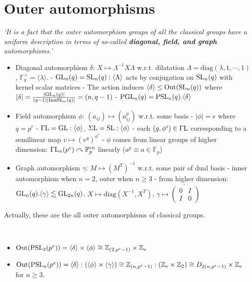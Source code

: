 \documentclass[a4paper,11pt]{article}
\def\subtitle#1{\section{#1}}
\begin{document}
\subtitle{Outer automorphisms}

\textit{`It is a fact that the outer automorphism groups of all the classical groups have a uniform description in terms of so-called \textbf{diagonal, field, and graph} automorphisms.’}

\begin{itemize}
    \item Diagonal automorphism $\delta$: $X\mapsto \Lambda^{-1} X\Lambda$ w.r.t. dilatation $\Lambda=\mathrm{diag}(\lambda,1,\cdots,1)$, $\mathbb{F}_q^\times=\langle \lambda\rangle$.
        \subitem- $\mathrm{GL}_n(q)=\mathrm{SL}_n(q):\langle \Lambda\rangle$ acts by conjugation on $\mathrm{SL}_n(q)$ with kernel scalar matrices
        \subitem- The action induces $\langle\delta\rangle\leq \mathrm{Out}(\mathrm{SL}_n(q))$ where $|\delta|=\frac{|\mathrm{GL}_n(q)|}{(q-1)|\mathrm{Inn} \mathrm{SL}_n(q)|}=(n,q-1)$
        \subitem- $\mathrm{PGL}_n(q)=\mathrm{PSL}_n(q).\langle \delta\rangle$ 
    \item Field automorphism $\phi$: $(a_{ij})\mapsto (a_{ij}^p)$ w.r.t. some basis
        \subitem- $|\phi|=e$ where $q=p^e$
        \subitem- $\mathrm{\Gamma L}=\mathrm{GL}:\langle \phi\rangle$, $\mathrm{\Sigma L}=\mathrm{SL}:\langle \phi\rangle$
        \subitem- each $(g,\phi^i)\in\mathrm{\Gamma L}$ corresponding to a semilinear map $v\mapsto (v^g)^{\phi^i}$
        \subitem- $\phi$ comes from linear groups of higher dimension: $\mathrm{\Gamma L}_n(p^e)\curvearrowright\mathbb{F}_p^{en}$ linearly ($a^p\equiv a\in\mathbb{F}_p$)
    \item Graph automorphism $\gamma$: $M\mapsto (M^T)^{-1}$ w.r.t. some pair of dual basis
        \subitem- inner automorphism when $n=2$, outer when $n\geq 3$
        \subitem- from higher dimension: $\mathrm{GL}_n(q).\langle\gamma\rangle\lesssim \mathrm{GL}_{2n}(q)$, $X\mapsto\mathrm{diag}(X^{-1},X^T)$, $\gamma\mapsto\widetilde{\left(\begin{smallmatrix}
            0 & I\\  I & 0
        \end{smallmatrix}\right)}$
\end{itemize}

Actually, these are the all outer automorphisms of classical groups.

\begin{theorem}\ 
    \begin{itemize}
        \item $\mathrm{Out}(\mathrm{PSL}_2(p^e))=\langle \delta\rangle\times \langle \phi\rangle\cong \mathbb{Z}_{(2,p^e-1)}\times\mathbb{Z}_e$ 
        \item $\mathrm{Out}(\mathrm{PSL}_n(p^e))=\langle \delta\rangle:(\langle \phi\rangle\times \langle\gamma\rangle)\cong \mathbb{Z}_{(n,p^e-1)}:(\mathbb{Z}_e\times\mathbb{Z}_2)\cong D_{2(n,p^e-1)}\times \mathbb{Z}_e$ for $n\geq 3$.
    \end{itemize}
\end{theorem}
\end{document}
